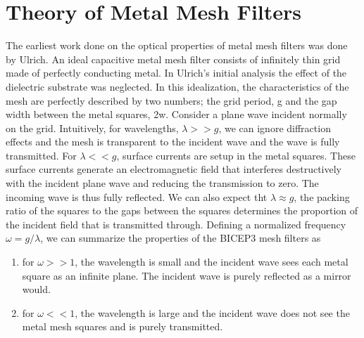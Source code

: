 \documentclass[12pt]{article}
\begin{document}


\section{Theory of Metal Mesh Filters}
   
The earliest work done on the optical properties of metal mesh filters was done by Ulrich. An ideal capacitive metal mesh filter consists of infinitely thin grid made of perfectly conducting metal. In Ulrich's initial analysis the effect of the dielectric substrate was neglected. In this idealization, the characteristics of the mesh are perfectly described by two numbers; the grid period, g and the gap width between the metal squares, 2w. Consider a plane wave incident normally on the grid. Intuitively, for wavelengths, $\lambda >> g$, we can ignore diffraction effects and the mesh is transparent to the incident wave and the wave is fully transmitted. For $\lambda << g$, surface currents are setup in the metal squares. These surface currents generate an electromagnetic field that interferes destructively with the incident plane wave and reducing the transmission to zero. The incoming wave is thus fully reflected. We can also expect tht  $\lambda \approx g$, the packing ratio of the squares to the gaps between the squares determines the proportion of the incident field that is transmitted through. Defining a normalized frequency $\omega = g/\lambda$, we can summarize the properties of the BICEP3 mesh filters as 

\begin{enumerate}
    \item for $\omega >> 1$, the wavelength is small and the incident wave sees each metal square as an infinite plane. The incident wave is purely reflected as a mirror would.
    \item for $\omega << 1$, the wavelength is large and the incident wave does not see the metal mesh squares and is purely transmitted.
\end{enumerate}  
\end{document}
